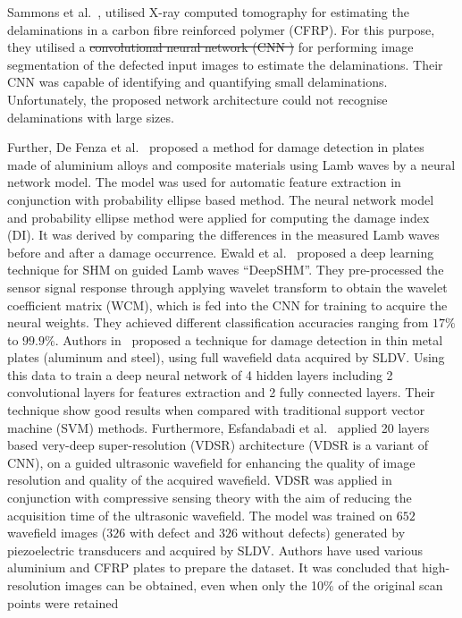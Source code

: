 \documentclass[preprint,9pt]{elsarticle}
\providecommand{\DIFaddtex}[1]{{\protect\color{blue}\uwave{#1}}} %
\providecommand{\DIFdeltex}[1]{{\protect\color{red}\sout{#1}}}                      %
\providecommand{\DIFaddbegin}{} %
\providecommand{\DIFaddend}{} %
\providecommand{\DIFdelbegin}{} %
\providecommand{\DIFdelend}{} %
\providecommand{\DIFadd}[1]{\texorpdfstring{\DIFaddtex{#1}}{#1}} %
\providecommand{\DIFdel}[1]{\texorpdfstring{\DIFdeltex{#1}}{}} %
\newcommand{\DIFscaledelfig}{0.5}
\newlength{\DIFdelgraphicswidth} %
\newlength{\DIFdelgraphicsheight} %
\newcommand{\DIFaddincludegraphics}[2][]{{\color{blue}\fbox{\DIFOincludegraphics[#1]{#2}}}} %
\newcommand{\DIFdelincludegraphics}[2][]{%
\sbox{\DIFdelgraphicsbox}{\DIFOincludegraphics[#1]{#2}}%
\settoboxwidth{\DIFdelgraphicswidth}{\DIFdelgraphicsbox} %
\settoboxtotalheight{\DIFdelgraphicsheight}{\DIFdelgraphicsbox} %
\scalebox{\DIFscaledelfig}{%
\parbox[b]{\DIFdelgraphicswidth}{\usebox{\DIFdelgraphicsbox}\\[-\baselineskip] \rule{\DIFdelgraphicswidth}{0em}}\llap{\resizebox{\DIFdelgraphicswidth}{\DIFdelgraphicsheight}{%
\setlength{\unitlength}{\DIFdelgraphicswidth}%
\begin{picture}(1,1)%
\thicklines\linethickness{2pt} %
{\color[rgb]{1,0,0}\put(0,0){\framebox(1,1){}}}%
{\color[rgb]{1,0,0}\put(0,0){\line( 1,1){1}}}%
{\color[rgb]{1,0,0}\put(0,1){\line(1,-1){1}}}%
\end{picture}%
}\hspace*{3pt}}} %
} %
\DeclareRobustCommand{\DIFaddbegin}{\DIFOaddbegin \let\includegraphics\DIFaddincludegraphics} %
\DeclareRobustCommand{\DIFaddend}{\DIFOaddend \let\includegraphics\DIFOincludegraphics} %
\DeclareRobustCommand{\DIFdelbegin}{\DIFOdelbegin \let\includegraphics\DIFdelincludegraphics} %
\DeclareRobustCommand{\DIFdelend}{\DIFOaddend \let\includegraphics\DIFOincludegraphics} %
\begin{document}
Sammons et al.~\cite{sammons2016segmenting}, utilised X-ray computed tomography for estimating the delaminations in a carbon fibre reinforced polymer (CFRP). 
For this purpose, they utilised a \DIFdelbegin \DIFdel{convolutional neural network (CNN ) }\DIFdelend \DIFaddbegin \DIFadd{CNN }\DIFaddend for performing image segmentation of the defected input images to estimate the delaminations. 
Their CNN was capable of identifying and quantifying small delaminations. 
Unfortunately, the proposed network architecture could not recognise delaminations with large sizes.

Further, De Fenza et al.~\cite{de2015application} proposed a method for damage detection in plates made of aluminium alloys and composite materials using Lamb waves by a neural network model.
The model was used for automatic feature extraction in conjunction with probability ellipse based method. 
The neural network model and probability ellipse method were applied for computing the damage index (DI). 
It was derived by comparing the differences in the measured  Lamb waves before and after a damage occurrence. 
Ewald et al.~\cite{Ewald2019} proposed a deep learning technique for SHM on guided Lamb waves \enquote{DeepSHM}. 
They pre-processed the sensor signal response through applying wavelet transform to obtain the wavelet coefficient matrix (WCM), which is fed into the CNN for training to acquire the neural weights. 
They achieved different classification accuracies ranging from \(17\%\) to \(99.9\%\).
Authors in~\cite{Melville2018} proposed a technique for damage detection in thin metal plates (aluminum and steel), using full wavefield data acquired by SLDV. 
Using this data to train a deep neural network of 4 hidden layers including 2 convolutional layers for features extraction and 2 fully connected layers. 
Their technique show good results when compared with traditional support vector machine (SVM) methods.
Furthermore, Esfandabadi et al.~\cite{esfandabadideep} applied 20 layers based very-deep super-resolution (VDSR) architecture (VDSR is a variant of CNN), on a guided ultrasonic wavefield for enhancing the quality of image resolution and quality of the acquired wavefield. 
VDSR was applied in conjunction with compressive sensing theory with the aim of reducing the acquisition time of the ultrasonic wavefield.
The model was trained on \(652\) wavefield images (\(326\) with defect and \(326\) without defects) generated by piezoelectric transducers and acquired by SLDV. 
Authors have used various aluminium and CFRP plates to prepare the dataset.
It was concluded that high-resolution images can be obtained, even when only the 10\% of the original scan points were retained
\end{document}
